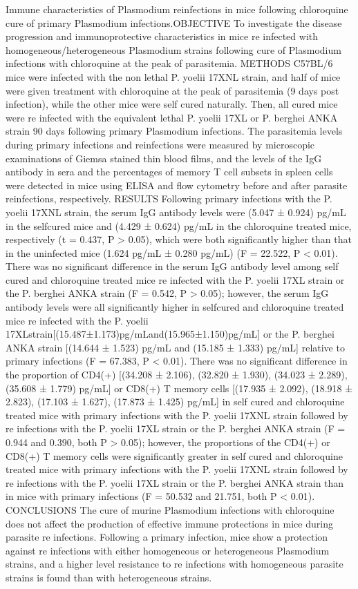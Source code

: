\documentclass{qqtarticle}
\begin{document}
            Immune characteristics of Plasmodium reinfections in mice following chloroquine cure of primary Plasmodium infections.OBJECTIVE  To investigate the disease progression and immunoprotective characteristics in mice re infected with homogeneous/heterogeneous Plasmodium strains following cure of Plasmodium infections with chloroquine at the peak of parasitemia. METHODS  C57BL/6 mice were infected with the non lethal P. yoelii 17XNL strain, and half of mice were given treatment with chloroquine at the peak of parasitemia (9 days post infection), while the other mice were self cured naturally. Then, all cured mice were re infected with the equivalent lethal P. yoelii 17XL or P. berghei ANKA strain 90 days following primary Plasmodium infections. The parasitemia levels during primary infections and reinfections were measured by microscopic examinations of Giemsa stained thin blood films, and the levels of the IgG antibody in sera and the percentages of memory T cell subsets in spleen cells were detected in mice using ELISA and flow cytometry before and after parasite reinfections, respectively. RESULTS  Following primary infections with the P. yoelii 17XNL strain, the serum IgG antibody levels were (5.047 ± 0.924) pg/mL in the selfcured mice and (4.429 ± 0.624) pg/mL in the chloroquine treated mice, respectively (t = 0.437, P > 0.05), which were both significantly higher than that in the uninfected mice (1.624 pg/mL ± 0.280 pg/mL) (F = 22.522, P < 0.01). There was no significant difference in the serum IgG antibody level among self cured and chloroquine treated mice re infected with the P. yoelii 17XL strain or the P. berghei ANKA strain (F = 0.542, P > 0.05); however, the serum IgG antibody levels were all significantly higher in selfcured and chloroquine treated mice re infected with the P. yoelii 17XLstrain[(15.487±1.173)pg/mLand(15.965±1.150)pg/mL] or the P. berghei ANKA strain [(14.644 ± 1.523) pg/mL and (15.185 ± 1.333) pg/mL] relative to primary infections (F = 67.383, P < 0.01). There was no significant difference in the proportion of CD4(+) [(34.208 ± 2.106), (32.820 ± 1.930), (34.023 ± 2.289), (35.608 ± 1.779) pg/mL] or CD8(+) T memory cells [(17.935 ± 2.092), (18.918 ± 2.823), (17.103 ± 1.627), (17.873 ± 1.425) pg/mL] in self cured and chloroquine treated mice with primary infections with the P. yoelii 17XNL strain followed by re infections with the P. yoelii 17XL strain or the P. berghei ANKA strain (F = 0.944 and 0.390, both P > 0.05); however, the proportions of the CD4(+) or CD8(+) T memory cells were significantly greater in self cured and chloroquine treated mice with primary infections with the P. yoelii 17XNL strain followed by re infections with the P. yoelii 17XL strain or the P. berghei ANKA strain than in mice with primary infections (F = 50.532 and 21.751, both P < 0.01). CONCLUSIONS  The cure of murine Plasmodium infections with chloroquine does not affect the production of effective immune protections in mice during parasite re infections. Following a primary infection, mice show a protection against re infections with either homogeneous or heterogeneous Plasmodium strains, and a higher level resistance to re infections with homogeneous parasite strains is found than with heterogeneous strains.
\end{document}
